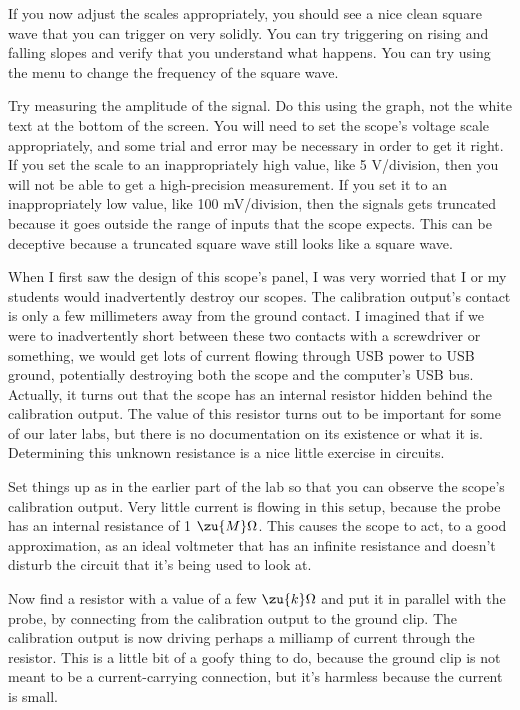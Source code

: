 If you now adjust the scales appropriately, you should see a nice clean square wave that you can trigger
on very solidly. You can try triggering on rising and falling slopes and verify that you understand what
happens. You can try using the menu to change the frequency of the square wave.

Try measuring the amplitude of the signal. Do this using the graph, not the white text at the bottom
of the screen. You will need to set the scope's voltage scale appropriately, and some trial and error
may be necessary in order to get it right. If you set the scale to an inappropriately high value,
like 5 V/division, then you will not be able to get a high-precision measurement. If you set it to an
inappropriately low value, like 100 mV/division, then the signals gets truncated because it goes outside
the range of inputs that the scope expects. This can be deceptive because a truncated square wave still
looks like a square wave. 


When I first saw the design of this scope's panel, I was very worried that I or
my students would inadvertently destroy our scopes. The calibration output's contact is only
a few millimeters away from the ground contact. I imagined that if we were to inadvertently
short between these two contacts with a screwdriver or something, we would get lots of
current flowing through USB power to USB ground, potentially destroying both the
scope and the computer's USB bus. Actually, it turns out that the scope has an internal
resistor hidden behind the calibration output. The value of this resistor turns out to
be important for some of our later labs, but there is no documentation on its existence
or what it is. Determining this unknown resistance is a nice little exercise in circuits.

Set things up as in the earlier part of the lab so that you can observe the
scope's calibration output. Very little current is flowing in this setup, because
the probe has an internal resistance of 1 $\zu{M}\Omega$. This causes the scope to act,
to a good approximation, as an ideal voltmeter that has an infinite resistance and
doesn't disturb the circuit that it's being used to look at.

Now find a resistor with a value of a few $\zu{k}\Omega$ and put it in parallel with
the probe, by connecting from the calibration output to the ground clip. The calibration
output is now driving perhaps a milliamp of current through the resistor. This is a little
bit of a goofy thing to do, because the ground clip is not meant to be a current-carrying
connection, but it's harmless because the current is small.

